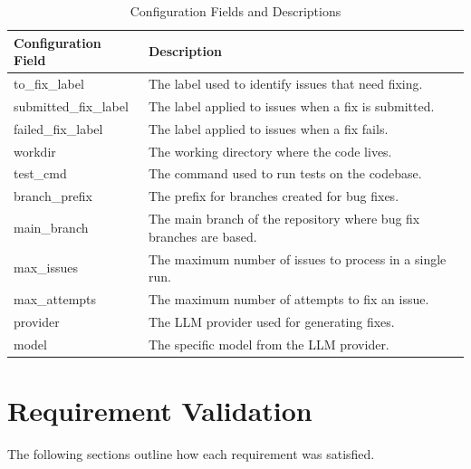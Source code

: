 \renewcommand{\arraystretch}{1.5}
\begin{longtable}{@{\extracolsep{\fill}} p{3.5cm} | p{11cm} @{}}
    \caption{Configuration Fields and Descriptions} \label{table:configuration}                        \\
    \toprule
    \textbf{Configuration Field} & \textbf{Description}                                                \\
    \midrule
    \endfirsthead

    \bottomrule
    \endfoot

    to\_fix\_label               & The label used to identify issues that need fixing.                 \\ \hline
    submitted\_fix\_label        & The label applied to issues when a fix is submitted.                \\ \hline
    failed\_fix\_label           & The label applied to issues when a fix fails.                       \\ \hline
    workdir                      & The working directory where the code lives.                         \\ \hline
    test\_cmd                    & The command used to run tests on the codebase.                      \\ \hline
    branch\_prefix               & The prefix for branches created for bug fixes.                      \\ \hline
    main\_branch                 & The main branch of the repository where bug fix branches are based. \\ \hline
    max\_issues                  & The maximum number of issues to process in a single run.            \\\hline
    max\_attempts                & The maximum number of attempts to fix an issue.                      \\ \hline
    provider                     & The LLM provider used for generating fixes.                         \\ \hline
    model                        & The specific model from the LLM provider.                           \\
\end{longtable}



\section{Requirement Validation}

The following sections outline how each requirement was satisfied.

